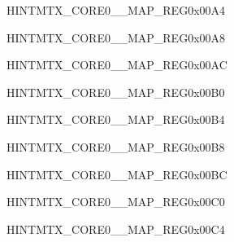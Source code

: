 \begin{register}{H}{INTMTX\_CORE0\_\_MAP\_REG}{0x00A4}\label{regdesc:INTMTXCORE0I2SINTRMAPREG}
\end{register}\vspace{-3em}


\begin{register}{H}{INTMTX\_CORE0\_\_MAP\_REG}{0x00A8}\label{regdesc:INTMTXCORE0UHCI0INTRMAPREG}
\end{register}\vspace{-3em}


\begin{register}{H}{INTMTX\_CORE0\_\_MAP\_REG}{0x00AC}\label{regdesc:INTMTXCORE0UART0INTRMAPREG}
\end{register}\vspace{-3em}


\begin{register}{H}{INTMTX\_CORE0\_\_MAP\_REG}{0x00B0}\label{regdesc:INTMTXCORE0UART1INTRMAPREG}
\end{register}\vspace{-3em}


\begin{register}{H}{INTMTX\_CORE0\_\_MAP\_REG}{0x00B4}\label{regdesc:INTMTXCORE0LEDCINTRMAPREG}
\end{register}\vspace{-3em}


\begin{register}{H}{INTMTX\_CORE0\_\_MAP\_REG}{0x00B8}\label{regdesc:INTMTXCORE0TWAI0INTRMAPREG}
\end{register}\vspace{-3em}


\begin{register}{H}{INTMTX\_CORE0\_\_MAP\_REG}{0x00BC}\label{regdesc:INTMTXCORE0TWAI1INTRMAPREG}
\end{register}\vspace{-3em}


\begin{register}{H}{INTMTX\_CORE0\_\_MAP\_REG}{0x00C0}\label{regdesc:INTMTXCORE0USBINTRMAPREG}
\end{register}\vspace{-3em}


\begin{register}{H}{INTMTX\_CORE0\_\_MAP\_REG}{0x00C4}\label{regdesc:INTMTXCORE0RMTINTRMAPREG}
\end{register}\vspace{-3em}


